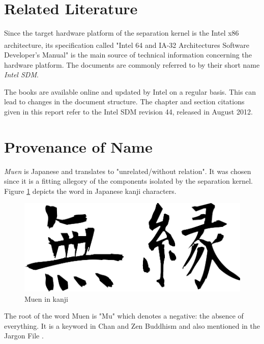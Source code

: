 \section{Related Literature}
Since the target hardware platform of the separation kernel is the Intel x86
architecture, its specification called "Intel\textsuperscript{\textregistered}
64 and IA-32 Architectures Software Developer's Manual"
\cite{IntelSDM} is the main source of technical information
concerning the hardware platform. The documents are commonly referred to by
their short name \emph{Intel SDM}.

The books are available online and updated by Intel on a regular basis. This
can lead to changes in the document structure. The chapter and section
citations given in this report refer to the Intel SDM revision 44, released in
August 2012.

\section{Provenance of Name}
\emph{Muen} is Japanese and translates to "unrelated/without relation". It was
chosen since it is a fitting allegory of the components isolated by the
separation kernel. Figure \ref{fig:muen} depicts the word in Japanese kanji
characters.

\begin{figure}[h]
	\centering
	\includegraphics[scale=0.4]{images/muen.pdf}
	\caption{Muen in kanji}
	\label{fig:muen}
\end{figure}

The root of the word Muen is "Mu" which denotes a negative: the absence of
everything. It is a keyword in Chan and Zen Buddhism and also mentioned in the
Jargon File \cite{jargonfile}.
